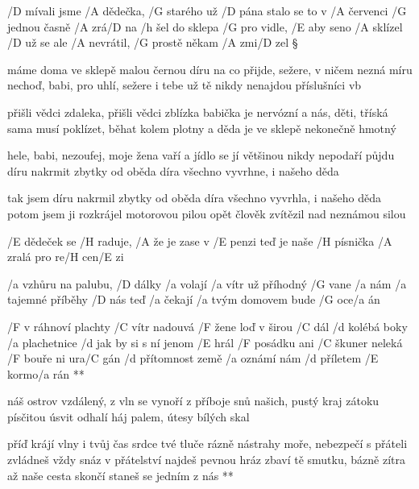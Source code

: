 





/D mívali jsme /A dědečka, /G starého už /D pána
stalo se to v /A červenci /G jednou časně /A zrá/D na
/h šel do sklepa /G pro vidle, /E aby seno /A sklízel
/D už se ale /A nevrátil, /G prostě někam /A zmi/D zel \S

máme doma ve sklepě malou černou díru
na co přijde, sežere, v ničem nezná míru
nechoď, babi, pro uhlí, sežere i tebe
už tě nikdy nenajdou příslušníci vb \s

přišli vědci zdaleka, přišli vědci zblízka
babička je nervózní a nás, děti, tříská
sama musí poklízet, běhat kolem plotny
a děda je ve sklepě nekonečně hmotný \s

hele, babi, nezoufej, moje žena vaří
a jídlo se jí většinou nikdy nepodaří
půjdu díru nakrmit zbytky od oběda
díra všechno vyvrhne, i našeho děda \s

tak jsem díru nakrmil zbytky od oběda
díra všechno vyvrhla, i našeho děda
potom jsem ji rozkrájel motorovou pilou
opět člověk zvítězil nad neznámou silou \s

/E dědeček se /H raduje, /A že je zase v /E penzi
teď je naše /H písnička /A zralá pro re/H cen/E zi




/a vzhůru na palubu, /D dálky /a volají
/a vítr už příhodný /G vane /a nám
/a tajemné příběhy /D nás teď /a čekají
/a tvým domovem bude /G oce/a án

\R  /F v ráhnoví plachty /C vítr nadouvá
    /F žene loď v širou /C dál
    /d kolébá boky /a plachetnice
    /d jak by si s ní jenom /E hrál
    /F posádku ani /C škuner neleká
    /F bouře ni ura/C gán
    /d přítomnost země /a oznámí nám
    /d příletem /E kormo/a rán **

náš ostrov vzdálený, z vln se vynoří
z příboje snů našich, pustý kraj
zátoku písčitou úsvit odhalí
háj palem, útesy bílých skal

\R  příď krájí vlny i tvůj čas
    srdce tvé tluče rázně
    nástrahy moře, nebezpečí
    s přáteli zvládneš vždy snáz
    v přátelství najdeš pevnou hráz
    zbaví tě smutku, bázně
    zítra až naše cesta skončí
    staneš se jedním z nás **




